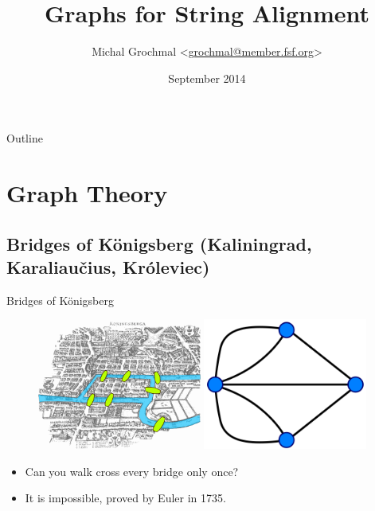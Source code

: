\documentclass[hyperref={colorlinks=true}]{beamer}
\title{Graphs for String Alignment}
\author{Michal Grochmal
  <\href{mailto:grochmal@member.fsf.org}{grochmal@member.fsf.org}>}
\institute{Queen Mary University of London}
\date{September 2014}
\begin{document}
\begin{frame}
  \titlepage
\end{frame}

\begin{frame}{Outline}
  \tableofcontents[pausesections]
\end{frame}

\section{Graph Theory}

\subsection[Bridges of K{\"o}nigsberg]
{Bridges of K{\"o}nigsberg (Kaliningrad, Karaliau{\v c}ius, Kr{\'o}leviec)}
\begin{frame}{Bridges of K{\"o}nigsberg}
  \begin{figure}
    \centering
    \includegraphics[width=0.48\textwidth]{bridges}
    \includegraphics[width=0.48\textwidth]{bridges-graph}
  \end{figure}
  \begin{itemize}
    \item[] Can you walk cross every bridge only once?
      \pause
    \item[] It is \alert{impossible}, proved by Euler in 1735.
  \end{itemize}
\end{frame}
\end{document}
